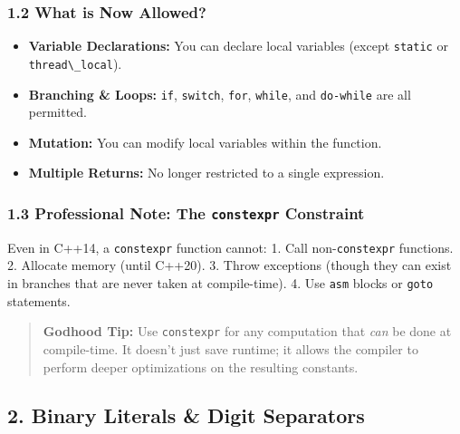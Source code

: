 \hypertarget{what-is-now-allowed}{%
\subsubsection{1.2 What is Now Allowed?}\label{what-is-now-allowed}}

\begin{itemize}
\tightlist
\item
  \textbf{Variable Declarations:} You can declare local variables
  (except \passthrough{\lstinline!static!} or
  \passthrough{\lstinline!thread\_local!}).
\item
  \textbf{Branching \& Loops:} \passthrough{\lstinline!if!},
  \passthrough{\lstinline!switch!}, \passthrough{\lstinline!for!},
  \passthrough{\lstinline!while!}, and
  \passthrough{\lstinline!do-while!} are all permitted.
\item
  \textbf{Mutation:} You can modify local variables within the function.
\item
  \textbf{Multiple Returns:} No longer restricted to a single
  expression.
\end{itemize}

\hypertarget{professional-note-the-constexpr-constraint}{%
\subsubsection{\texorpdfstring{1.3 Professional Note: The
\texttt{constexpr}
Constraint}{1.3 Professional Note: The constexpr Constraint}}\label{professional-note-the-constexpr-constraint}}

Even in C++14, a \passthrough{\lstinline!constexpr!} function cannot: 1.
Call non-\passthrough{\lstinline!constexpr!} functions. 2. Allocate
memory (until C++20). 3. Throw exceptions (though they can exist in
branches that are never taken at compile-time). 4. Use
\passthrough{\lstinline!asm!} blocks or \passthrough{\lstinline!goto!}
statements.

\begin{quote}
\textbf{Godhood Tip:} Use \passthrough{\lstinline!constexpr!} for any
computation that \emph{can} be done at compile-time. It doesn't just
save runtime; it allows the compiler to perform deeper optimizations on
the resulting constants.
\end{quote}

\hypertarget{binary-literals-digit-separators}{%
\subsection{2. Binary Literals \& Digit
Separators}\label{binary-literals-digit-separators}}

